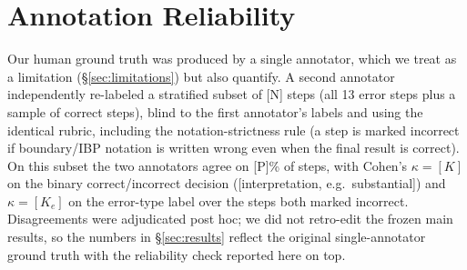 \section{Annotation Reliability}
\label{sec:iaa}

Our human ground truth was produced by a single annotator, which we treat as a
limitation (\S\ref{sec:limitations}) but also quantify. A second annotator
independently re-labeled a stratified subset of [N] steps (all 13 error steps
plus a sample of correct steps), blind to the first annotator's labels and using
the identical rubric, including the notation-strictness rule (a step is marked
incorrect if boundary/IBP notation is written wrong even when the final result is
correct). On this subset the two annotators agree on [P]\% of steps, with
Cohen's $\kappa = [K]$ on the binary correct/incorrect decision
([interpretation, e.g.\ substantial]) and $\kappa = [K_e]$ on the error-type
label over the steps both marked incorrect. Disagreements were adjudicated post
hoc; we did not retro-edit the frozen main results, so the numbers in
\S\ref{sec:results} reflect the original single-annotator ground truth with the
reliability check reported here on top.
